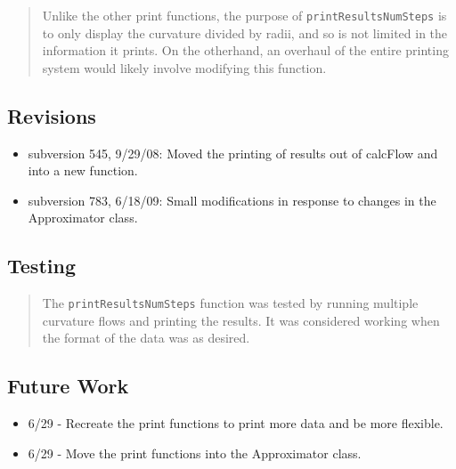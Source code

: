 \documentclass[10pt]{article}%
\begin{document}
\begin{quotation} Unlike the other print functions, the purpose of \texttt{printResultsNumSteps} is to only display the curvature divided by radii, and so is not limited in the information it prints. On the otherhand, an overhaul of the entire printing system would likely involve modifying this function.\end{quotation}

\subsection*{Revisions}

\begin{itemize}\item  subversion 545, 9/29/08: Moved the printing of results out of calcFlow and into a new function.
\item  subversion 783, 6/18/09: Small modifications in response to changes in the Approximator class.
\end{itemize}

\subsection*{Testing}

\begin{quotation} The \texttt{printResultsNumSteps} function was tested by running multiple curvature flows and printing the results. It was considered working when the format of the data was as desired.\end{quotation}

\subsection*{Future Work}

\begin{itemize}\item  6/29 - Recreate the print functions to print more data and be more flexible.
\item  6/29 - Move the print functions into the Approximator class.
\end{itemize}
    

%
\end{document}

